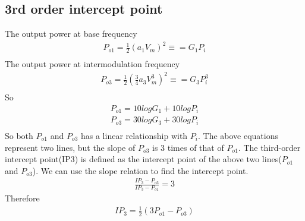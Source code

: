 \documentclass[a4paper]{article}
\begin{document}
\subsection{3rd order intercept point}
The output power at base frequency 
\begin{align*}
	P_{o1} = \frac{1}{2} (a_1 V_m)^2 \equiv = G_1 P_i \\ 
\end{align*}
The output power at intermodulation frequency 
\begin{align*}
	P_{o3} = \frac{1}{2} (\frac{3}{4}a_3 V^3_m)^2 \equiv = G_3 P^3_i \\
\end{align*}
So
\begin{align*}
	P_{o1} = 10 log G_1 + 10 log P_i\\
    P_{o3} = 30 log G_3	+ 30 log P_i\\
 \end{align*}
 So both $P_{o1}$ and $P_{o3}$ has a linear relationship with $P_i$. The above equations represent two lines, but the slope of $P_{o3}$ is 3 times of that of $P_{o1}$.
 The third-order intercept point(IP3) is defined as the intercept point of the above two lines($P_{o1}$ and $P_{o3}$). We can use the slope relation to find the intercept point.
 \begin{align*}
	\frac{IP_3 - P_{o3}}{IP_3 - P_{o1}} = 3
\end{align*}
Therefore
\begin{align*}
	IP_3 = \frac{1}{2} (3P_{o1} - P_{o3})
\end{align*}
\end{document}
